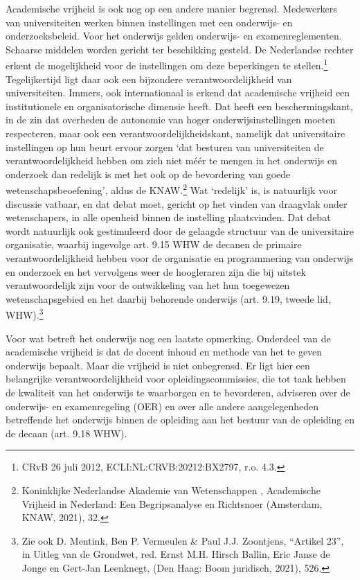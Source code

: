 \documentclass[empirical, authordate, ]{new-jote-article}
\begin{document}
	Academische vrijheid is ook nog op een andere manier begrensd. Medewerkers van universiteiten werken binnen instellingen met een onderwijs- en onderzoeksbeleid. Voor het onderwijs gelden onderwijs- en examenreglementen. Schaarse middelen worden gericht ter beschikking gesteld. De Nederlandse rechter erkent de mogelijkheid voor de instellingen om deze beperkingen te stellen.\footnote{CRvB 26 juli 2012, ECLI:NL:CRVB:20212:BX2797, r.o. 4.3.} Tegelijkertijd ligt daar ook een bijzondere verantwoordelijkheid van universiteiten. Immers, ook internationaal is erkend dat academische vrijheid een institutionele en organisatorische dimensie heeft. Dat heeft een beschermingskant, in de zin dat overheden de autonomie van hoger onderwijsinstellingen moeten respecteren, maar ook een verantwoordelijkheidskant, namelijk dat universitaire instellingen op hun beurt ervoor zorgen ‘dat besturen van universiteiten de verantwoordelijkheid hebben om zich niet méér te mengen in het onderwijs en onderzoek dan redelijk is met het ook op de bevordering van goede wetenschapsbeoefening', aldus de KNAW.\footnote{Koninklijke Nederlandse Akademie van Wetenschappen , Academische Vrijheid in Nederland: Een Begripsanalyse en Richtsnoer (Amsterdam, KNAW, 2021), 32.} Wat ‘redelijk' is, is natuurlijk voor discussie vatbaar, en dat debat moet, gericht op het vinden van draagvlak onder wetenschapers, in alle openheid binnen de instelling plaatsvinden. Dat debat wordt natuurlijk ook gestimuleerd door de gelaagde structuur van de universitaire organisatie, waarbij ingevolge art. 9.15 WHW de decanen de primaire verantwoordelijkheid hebben voor de organisatie en programmering van onderwijs en onderzoek en het vervolgens weer de hoogleraren zijn die bij uitstek verantwoordelijk zijn voor de ontwikkeling van het hun toegewezen wetenschapsgebied en het daarbij behorende onderwijs (art. 9.19, tweede lid, WHW).\footnote{Zie ook D. Mentink, Ben P. Vermeulen \& Paul J.J. Zoontjens, “Artikel 23”, in Uitleg van de Grondwet, red. Ernst M.H. Hirsch Ballin, Eric Janse de Jonge en Gert-Jan Leenknegt, (Den Haag: Boom juridisch, 2021), 526.}



	Voor wat betreft het onderwijs nog een laatste opmerking. Onderdeel van de academische vrijheid is dat de docent inhoud en methode van het te geven onderwijs bepaalt. Maar die vrijheid is niet onbegrensd. Er ligt hier een belangrijke verantwoordelijkheid voor opleidingscommissies, die tot taak hebben de kwaliteit van het onderwijs te waarborgen en te bevorderen, adviseren over de onderwijs- en examenregeling (OER) en over alle andere aangelegenheden betreffende het onderwijs binnen de opleiding aan het bestuur van de opleiding en de decaan (art. 9.18 WHW).
\end{document}
